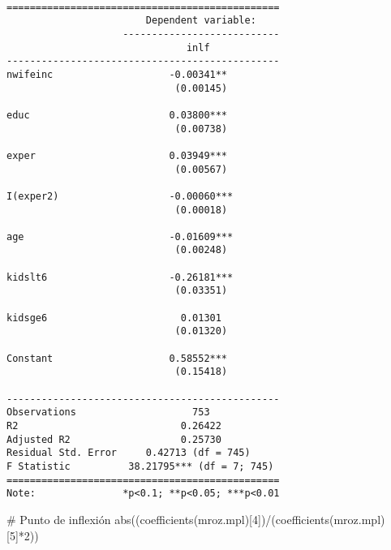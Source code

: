\documentclass[
  letterpaper,
  DIV=11,
  numbers=noendperiod]{scrreprt}
\newenvironment{Shaded}{\begin{snugshade}}{\end{snugshade}}
\newcommand{\CommentTok}[1]{\textcolor[rgb]{0.37,0.37,0.37}{#1}}
\newcommand{\DecValTok}[1]{\textcolor[rgb]{0.68,0.00,0.00}{#1}}
\newcommand{\FunctionTok}[1]{\textcolor[rgb]{0.28,0.35,0.67}{#1}}
\newcommand{\NormalTok}[1]{\textcolor[rgb]{0.00,0.23,0.31}{#1}}
\newcommand{\SpecialCharTok}[1]{\textcolor[rgb]{0.37,0.37,0.37}{#1}}
\begin{document}
\begin{verbatim}

===============================================
                        Dependent variable:    
                    ---------------------------
                               inlf            
-----------------------------------------------
nwifeinc                    -0.00341**         
                             (0.00145)         
                                               
educ                        0.03800***         
                             (0.00738)         
                                               
exper                       0.03949***         
                             (0.00567)         
                                               
I(exper2)                   -0.00060***        
                             (0.00018)         
                                               
age                         -0.01609***        
                             (0.00248)         
                                               
kidslt6                     -0.26181***        
                             (0.03351)         
                                               
kidsge6                       0.01301          
                             (0.01320)         
                                               
Constant                    0.58552***         
                             (0.15418)         
                                               
-----------------------------------------------
Observations                    753            
R2                            0.26422          
Adjusted R2                   0.25730          
Residual Std. Error     0.42713 (df = 745)     
F Statistic          38.21795*** (df = 7; 745) 
===============================================
Note:               *p<0.1; **p<0.05; ***p<0.01
\end{verbatim}

\begin{Shaded}
\begin{Highlighting}[]
\CommentTok{\# Punto de inflexión}
\FunctionTok{abs}\NormalTok{((}\FunctionTok{coefficients}\NormalTok{(mroz.mpl)[}\DecValTok{4}\NormalTok{])}\SpecialCharTok{/}\NormalTok{(}\FunctionTok{coefficients}\NormalTok{(mroz.mpl)[}\DecValTok{5}\NormalTok{]}\SpecialCharTok{*}\DecValTok{2}\NormalTok{))}
\end{Highlighting}
\end{Shaded}
\end{document}
